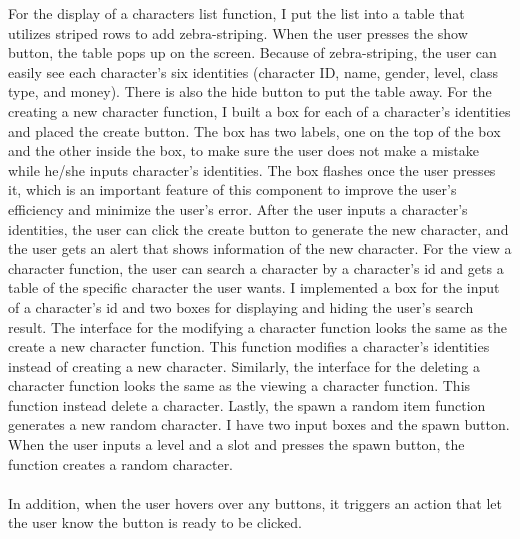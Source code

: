 \documentclass[100pt]{article}
\begin{document}
\large{
For the display of a characters list function, I put the list into a table that utilizes striped rows to add zebra-striping. When the user presses the show button, the table pops up on the screen. Because of zebra-striping, the user can easily see each character's six identities (character ID, name, gender, level, class type, and money). There is also the hide button to put the table away. For the creating a new character function, I built a box for each of a character's identities and placed the create button. The box has two labels, one on the top of the box and the other inside the box, to make sure the user does not make a mistake while he/she inputs character's identities. The box flashes once the user presses it, which is an important feature of this component to improve the user's efficiency and minimize the user's error. After the user inputs a character's identities, the user can click the create button to generate the new character, and the user gets an alert that shows information of the new character. For the view a character function, the user can search a character by a character's id and gets a table of the specific character the user wants. I implemented a box for the input of a character's id and two boxes for displaying and hiding the user's search result. The interface for the modifying a character function looks the same as the create a new character function. This function modifies a character's identities instead of creating a new character. Similarly, the interface for the deleting a character function looks the same as the viewing a character function. This function instead delete a character. Lastly, the spawn a random item function generates a new random character. I have two input boxes and the spawn button. When the user inputs a level and a slot and presses the spawn button, the function creates a random character.
\\\\
In addition, when the user hovers over any buttons, it triggers an action that let the user know the button is ready to be clicked. 

}
\end{document}
